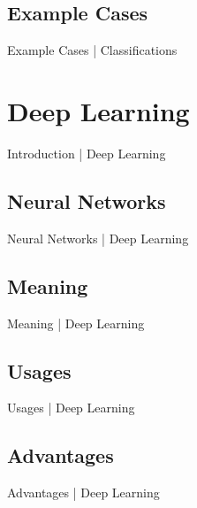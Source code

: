 \documentclass[10pt]{beamer}
\begin{document}
		\subsection{Example Cases}
			\begin{frame}{Example Cases | Classifications}
			\end{frame}
	
	
	\section{Deep Learning}
		\begin{frame}{Introduction | Deep Learning}
		\end{frame}
		\subsection{Neural Networks}
			\begin{frame}{Neural Networks | Deep Learning}
			\end{frame}
		\subsection{Meaning}
			\begin{frame}{Meaning | Deep Learning}
			\end{frame}
		\subsection{Usages}
			\begin{frame}{Usages | Deep Learning}
			\end{frame}
		\subsection{Advantages}
			\begin{frame}{Advantages | Deep Learning}
			\end{frame}
	
	
	
\end{document}
